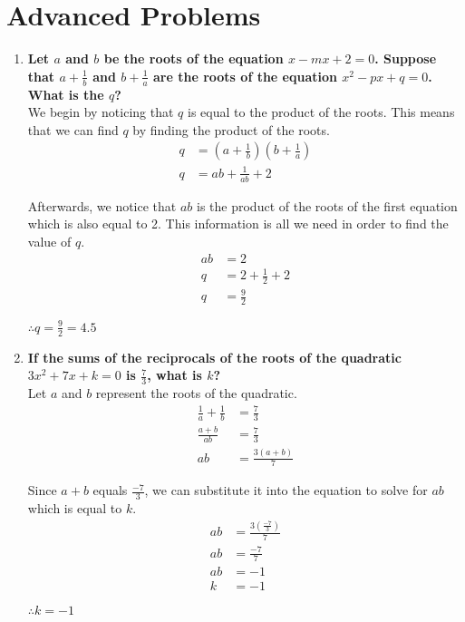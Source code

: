 \documentclass[12pt]{article}
\begin{document}
\section*{Advanced Problems}
\begin{enumerate}
    \item \textbf{Let $a$ and $b$ be the roots of the equation $x - mx + 2 = 0$. Suppose that $a + \frac{1}{b}$  and $b + \frac{1}{a}$ are the roots of the equation $x^2 - px + q = 0$. What is the $q$?} \\
    
    We begin by noticing that $q$ is equal to the product of the roots. This means that we can find $q$ by finding the product of the roots.
    \begin{align*}
        q&=(a+\frac{1}{b})(b+\frac{1}{a}) \\
        q&=ab+\frac{1}{ab}+2
    \end{align*}
    
    Afterwards, we notice that $ab$ is the product of the roots of the first equation which is also equal to 2. This information is all we need in order to find the value of $q$.
    \begin{align*}
        ab&=2 \\
        q&=2+\frac{1}{2}+2 \\
        q&=\frac{9}{2}
    \end{align*}
    
    $\therefore q=\frac{9}{2}=4.5$
    
    \item \textbf{If the sums of the reciprocals of the roots of the quadratic $3x^2 + 7x + k = 0$ is $\frac{7}{3}$, what is $k$?} \\
    
    Let $a$ and $b$ represent the roots of the quadratic.
    \begin{align*}
        \frac{1}{a}+\frac{1}{b}&=\frac{7}{3} \\
        \frac{a+b}{ab}&=\frac{7}{3} \\
        ab&=\frac{3(a+b)}{7}
    \end{align*}
    
    Since $a+b$ equals $\frac{-7}{3}$, we can substitute it into the equation to solve for $ab$ which is equal to $k$.
    \begin{align*}
        ab&=\frac{3(\frac{-7}{3})}{7} \\
        ab&=\frac{-7}{7} \\
        ab&=-1 \\
        k&=-1
    \end{align*}
    
    $\therefore k=-1$
    
\end{enumerate}
\end{document}
